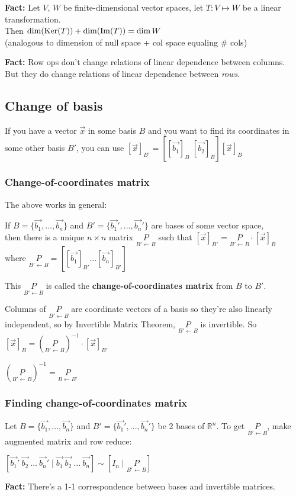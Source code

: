 \textbf{Fact:} Let $V$, $W$ be finite-dimensional vector spaces, let $T\colon V \mapsto W$ be a linear transformation.\\
Then $\dim(\operatorname{Ker}(T)) + \dim(\operatorname{Im}(T)) = \dim W$\\
(analogous to dimension of null space + col space equaling \# cols)

\textbf{Fact:} Row ops don't change relations of linear dependence between columns.\\
But they do change relations of linear dependence between \emph{rows}.

\subsection{Change of basis}

If you have a vector $\vec x$ in some basis $B$ and you want to find its coordinates in some other basis $B'$, you can use $[\vec x]_{B'} = \left[\left[\vec{b_1}\right]_B  \,\, \left[\vec{b_2}\right]_B\right][\vec x]_B$

\subsubsection*{Change-of-coordinates matrix}

The above works in general:

If $B = \{\vec{b_1}, ..., \vec{b_n}\}$ and $B' = \{\vec{b_1}', ..., \vec{b_n}'\}$ are bases of some vector space,\\
then there is a unique $n \times n$ matrix $\underset{B' \leftarrow B}{P}$ such that $[\vec x]_{B'} = \underset{B' \leftarrow B}{P} \cdot [\vec x]_{B}$\\
where $\underset{B' \leftarrow B}{P} = \left[\left[\vec{b_1}\right]_{B'} ... \left[\vec{b_n}\right]_{B'}\right]$

This $\underset{B' \leftarrow B}{P}$ is called the \textbf{change-of-coordinates matrix} from $B$ to $B'$.

Columns of $\underset{B' \leftarrow B}{P}$ are coordinate vectors of a basis so they're also linearly independent, so by Invertible Matrix Theorem, $\underset{B' \leftarrow B}{P}$ is invertible. So\\
$[\vec x]_{B} = \left(\underset{B' \leftarrow B}{P}\right)^{-1} \cdot [\vec x]_{B'}$

$\left(\underset{B' \leftarrow B}{P}\right)^{-1} = \underset{B \leftarrow B'}{P}$

\subsubsection*{Finding change-of-coordinates matrix}
Let $B = \{\vec{b_1}, ..., \vec{b_n}\}$ and $B' = \{\vec{b_1}', ..., \vec{b_n}'\}$ be 2 bases of $\mathbb{R}^n$. To get $\underset{B' \leftarrow B}{P}$, make augmented matrix and row reduce:

$\left[ \vec{b_1}' ~ \vec{b_2} ~ ... ~ \vec{b_n}' \mid \vec{b_1} ~ \vec{b_2} ~ ... ~ \vec{b_n} \right] \sim \left[I_n \mid \underset{B' \leftarrow B}{P} \right]$

\textbf{Fact:} There's a 1-1 correspondence between bases and invertible matrices.